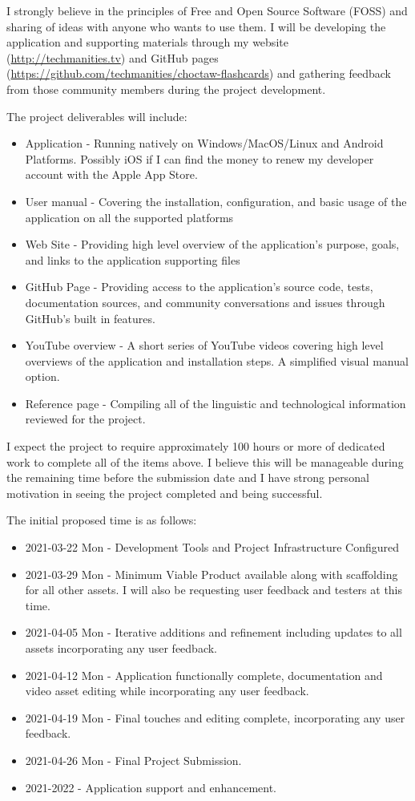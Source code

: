 \documentclass[12pt,letterpaper]{article}
\begin{document}
I strongly believe in the principles of Free and Open Source Software (FOSS) and sharing of ideas with anyone who wants to use them. I will be developing the application and supporting materials through my website (\url{http://techmanities.tv}) and GitHub pages (\url{https://github.com/techmanities/choctaw-flashcards}) and gathering feedback from those community members during the project development.

The project deliverables will include:
\begin{itemize}
	\item Application - Running natively on Windows/MacOS/Linux and Android Platforms. Possibly iOS if I can find the money to renew my developer account with the Apple App Store.
	\item User manual - Covering the installation, configuration, and basic usage of the application on all the supported platforms
	\item Web Site - Providing high level overview of the application's purpose, goals, and links to the application supporting files
	\item GitHub Page - Providing access to the application's source code, tests, documentation sources, and community conversations and issues through GitHub's built in features.
	\item YouTube overview - A short series of YouTube videos covering high level overviews of the application and installation steps. A simplified visual manual option.
	\item Reference page - Compiling all of the linguistic and technological information reviewed for the project.
\end{itemize}


I expect the project to require approximately 100 hours or more of dedicated work to complete all of the items above. I believe this will be manageable during the remaining time before the submission date and I have strong personal motivation in seeing the project completed and being successful.

The initial proposed time is as follows:
\begin{itemize}
	\item 2021-03-22 Mon - Development Tools and Project Infrastructure Configured
	\item 2021-03-29 Mon - Minimum Viable Product available along with scaffolding for all other assets. I will also be requesting user feedback and testers at this time.
	\item 2021-04-05 Mon - Iterative additions and refinement including updates to all assets incorporating any user feedback.
	\item 2021-04-12 Mon - Application functionally complete, documentation and video asset editing while incorporating any user feedback.
	\item 2021-04-19 Mon - Final touches and editing complete, incorporating any user feedback.
	\item 2021-04-26 Mon - Final Project Submission.
	\item 2021-2022 - Application support and enhancement.
\end{itemize}
\end{document}

